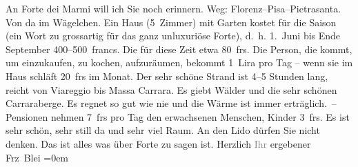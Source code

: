 \begin{ledgroupsized}[t]{13cm}
           An Forte dei Marmi will ich Sie noch erinnern.
               Weg: Florenz–Pisa–Pietrasanta. Von da im Wägelchen.
               Ein Haus (5 Zimmer) mit Garten kostet für die Saison (ein Wort zu grossartig für das
               ganz unluxuriöse Forte), d. h.
                  1. Juni bis Ende September 400–500 francs. Die \label{K_L01998_3v}\label{K_L01998_3h} für diese Zeit etwa 80 frs.
               Die Person, die kommt, um einzukaufen, zu kochen, aufzuräumen, bekommt 1 Lira pro Tag
               – wenn sie im Haus schläft 20 frs im Monat. {\pb}Der sehr schöne Strand ist 4–5 Stunden
               lang, reicht von Viareggio bis Massa Carrara. Es giebt Wälder und die sehr
               schönen Carraraberge. Es regnet so gut wie nie
               und die Wärme ist immer erträglich. –\pend
           \pstart
           Pensionen nehmen 7 frs pro Tag den erwachsenen Menschen, Kinder 3 frs.\pend
           \pstart
           Es ist sehr schön, sehr still da und sehr viel Raum. An den Lido dürfen Sie nicht denken.\pend
           \pstart
           Das ist alles was über Forte zu sagen ist.\pend
           \pstart
           Herzlich \textcolor{gray}{Ihr} ergebener{\\[\baselineskip]}\spacefill\mbox{Frz Blei}\pend
           \leftskip=0em{}
         
         \endnumbering{}\end{ledgroupsized}  \newcommand{\dateiname}{L01998}\newcommand{\titel}{Franz Blei an Arthur Schnitzler, [Anfang? Januar 1911]}\newcommand{\editorInnen}{Martin Anton Müller und Gerd-Hermann Susen}
      